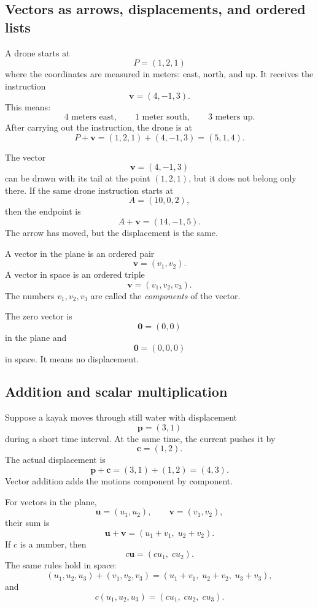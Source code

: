 \subsection{Vectors as arrows, displacements, and ordered lists}

A drone starts at
\[
    P=(1,2,1)
\]
where the coordinates are measured in meters: east, north, and up.  It receives the
instruction
\[
    \mathbf v=(4,-1,3).
\]
This means:
\[
    4 \text{ meters east}, \qquad 1 \text{ meter south}, \qquad 3 \text{ meters up}.
\]
After carrying out the instruction, the drone is at
\[
    P+\mathbf v=(1,2,1)+(4,-1,3)=(5,1,4).
\]

\begin{example}
The vector
\[
    \mathbf v=(4,-1,3)
\]
can be drawn with its tail at the point \((1,2,1)\), but it does not belong only
there.  If the same drone instruction starts at
\[
    A=(10,0,2),
\]
then the endpoint is
\[
    A+\mathbf v=(14,-1,5).
\]
The arrow has moved, but the displacement is the same.
\end{example}

\begin{definition}
A vector in the plane is an ordered pair
\[
    \mathbf v=(v_1,v_2).
\]
A vector in space is an ordered triple
\[
    \mathbf v=(v_1,v_2,v_3).
\]
The numbers \(v_1,v_2,v_3\) are called the \emph{components} of the vector.
\end{definition}

The zero vector is
\[
    \mathbf 0=(0,0)
\]
in the plane and
\[
    \mathbf 0=(0,0,0)
\]
in space.  It means no displacement.

\subsection{Addition and scalar multiplication}

Suppose a kayak moves through still water with displacement
\[
    \mathbf p=(3,1)
\]
during a short time interval.  At the same time, the current pushes it by
\[
    \mathbf c=(1,2).
\]
The actual displacement is
\[
    \mathbf p+\mathbf c=(3,1)+(1,2)=(4,3).
\]
Vector addition adds the motions component by component.

\begin{definition}
For vectors in the plane,
\[
    \mathbf u=(u_1,u_2), \qquad \mathbf v=(v_1,v_2),
\]
their sum is
\[
    \mathbf u+\mathbf v=(u_1+v_1,\;u_2+v_2).
\]
If \(c\) is a number, then
\[
    c\mathbf u=(cu_1,\;cu_2).
\]
The same rules hold in space:
\[
    (u_1,u_2,u_3)+(v_1,v_2,v_3)
    =(u_1+v_1,\;u_2+v_2,\;u_3+v_3),
\]
and
\[
    c(u_1,u_2,u_3)=(cu_1,\;cu_2,\;cu_3).
\]
\end{definition}

